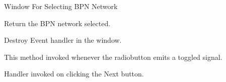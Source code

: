\documentclass[letterpaper,10pt,english]{sphinxmanual}
\begin{document}
\label{index:module-select_network}

\begin{fulllineitems}
\label{index:select_network.selectbpn_window}
Window For Selecting BPN Network


\begin{fulllineitems}
\label{index:select_network.selectbpn_window.get_network}
Return the BPN network selected.

\end{fulllineitems}



\begin{fulllineitems}
\label{index:select_network.selectbpn_window.on_create_window_destroy}
Destroy Event handler in the window.

\end{fulllineitems}



\begin{fulllineitems}
\label{index:select_network.selectbpn_window.on_network_selection}
This method invoked whenever the radiobutton emits a toggled signal.

\end{fulllineitems}



\begin{fulllineitems}
\label{index:select_network.selectbpn_window.on_next}
Handler invoked on clicking the Next button.

\end{fulllineitems}


\end{fulllineitems}
\end{document}
